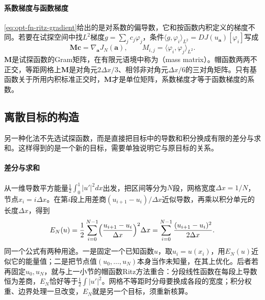 \paragraph{系数梯度与函数梯度}
\eqref{eq:opt-fn-ritz-gradient}给出的是对系数的偏导数，它和按函数内积定义的梯度不同。若要在试探空间中找$L^2$梯度$g=\sum_jc_j\varphi_j$，条件$\langle g,\varphi_i\rangle_{L^2}=DJ(u_{\bm a})[\varphi_i]$写成
\[
 \bm M\bm c=\nabla_{\bm a}J_N(\bm a),\qquad M_{i,j}=\langle\varphi_i,\varphi_j\rangle_{L^2} .
\]
$\bm M$是试探函数的Gram矩阵，在有限元语境中称为（mass matrix）。帽函数两两不正交，等距网格上$\bm M$是对角元$2\Delta x/3$、相邻非对角元$\Delta x/6$的三对角矩阵。只有基函数关于所用内积标准正交时，$\bm M$才是单位矩阵，系数梯度才等于函数梯度的系数。

\subsection{离散目标的构造}
\label{sec:opt-fn-discrete-objective}

另一种化法不先选试探函数，而是直接把目标中的导数和积分换成有限的差分与求和。这样得到的是一个新的目标，需要单独说明它与原目标的关系。

\paragraph{差分与求和}
从一维导数平方能量$\frac12\int_0^1|u'|^2dx$出发，把区间等分为$N$段，网格宽度$\Delta x=1/N$，节点$x_i=i\Delta x$。在第$i$段上用差商$(u_{i+1}-u_i)/\Delta x$近似导数，再乘以积分单元的长度$\Delta x$，得到
\begin{equation}
 E_N(u)=\frac12\sum_{i=0}^{N-1}\Bigl(\frac{u_{i+1}-u_i}{\Delta x}\Bigr)^2\Delta x=\sum_{i=0}^{N-1}\frac{(u_{i+1}-u_i)^2}{2\Delta x} .
 \label{eq:opt-fn-discrete-energy}
\end{equation}
同一个公式有两种用途。一是固定一个已知函数$u$，取$u_i=u(x_i)$，用$E_N(u)$近似它的能量值；二是把节点值$(u_0,\dots,u_N)$本身当作未知量，在其上优化。后者若再固定$u_0,u_N$，就与上一小节的帽函数Ritz方法重合：分段线性函数在每段上导数恒为差商，$E_N$恰好等于$\frac12\int|u'|^2$。网格不等距时分母要换成各段的宽度；积分权重、边界处理一旦改变，$E_N$就是另一个目标，须重新核算。

